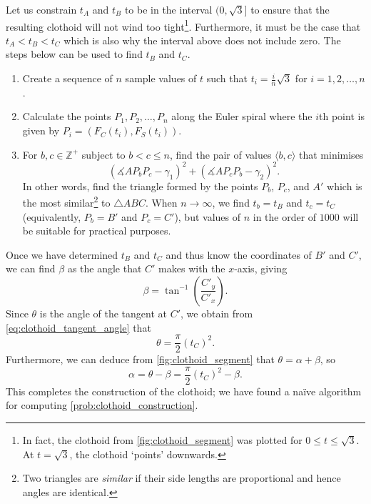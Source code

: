 Let us constrain $t_A$ and $t_B$ to be in the interval $(0, \sqrt{3}]$ to ensure that the resulting clothoid will not wind too tight\footnote{In fact, the clothoid from \ref{fig:clothoid_segment} was plotted for $0 \leq t \leq \sqrt{3}$. At $t=\sqrt{3}$, the clothoid `points' downwards.}.
Furthermore, it must be the case that $t_A<t_B<t_C$ which is also why the interval above does not include zero.
The steps below can be used to find $t_B$ and $t_C$.
\begin{enumerate}
    \item Create a sequence of $n$ sample values of $t$ such that $t_i = \frac{i}{n}\sqrt{3}$ for $i=1,2,\dots,n$.
    \item Calculate the points $P_1,P_2,\dots,P_n$ along the Euler spiral where the $i$th point is given by $P_i = (F_C(t_i),F_S(t_i))$.
    \item For $b,c \in \mathbb{Z}^+$ subject to $b<c\leq n$, find the pair of values $\langle b,c \rangle$ that minimises
        \begin{equation}
            \label{eq:clothoid_construction_error}
            \left(\measuredangle{AP_bP_c} - \gamma_1\right)^2 + \left(\measuredangle{AP_cP_b} - \gamma_2\right)^2.
        \end{equation}
        In other words, find the triangle formed by the points $P_b$, $P_c$, and $A'$ which is the most similar\footnote{Two triangles are \textit{similar} if their side lengths are proportional and hence angles are identical.} to $\triangle{ABC}$. 
        When $n\to\infty$, we find $t_b=t_B$ and $t_c=t_C$ (equivalently, $P_b=B'$ and $P_c=C'$), but values of $n$ in the order of $1000$ will be suitable for practical purposes.
\end{enumerate}

Once we have determined $t_B$ and $t_C$ and thus know the coordinates of $B'$ and $C'$, we can find $\beta$ as the angle that $C'$ makes with the $x$-axis, giving
\begin{equation}
    \beta = \tan^{-1} \left( \frac{C'_y}{C'_x} \right).
\end{equation}
Since $\theta$ is the angle of the tangent at $C'$, we obtain from \ref{eq:clothoid_tangent_angle} that
\begin{equation}
    \label{eq:clothoid_theta}
    \theta=\frac{\pi}{2} \left(t_C\right)^2.
\end{equation}
Furthermore, we can deduce from  \ref{fig:clothoid_segment} that $\theta=\alpha+\beta$, so
\begin{equation}
    \label{eq:clothoid_alpha}
    \alpha = \theta - \beta = \frac{\pi}{2} \left(t_C\right)^2 - \beta.
\end{equation}
This completes the construction of the clothoid; we have found a na\"{i}ve algorithm for computing \ref{prob:clothoid_construction}.



